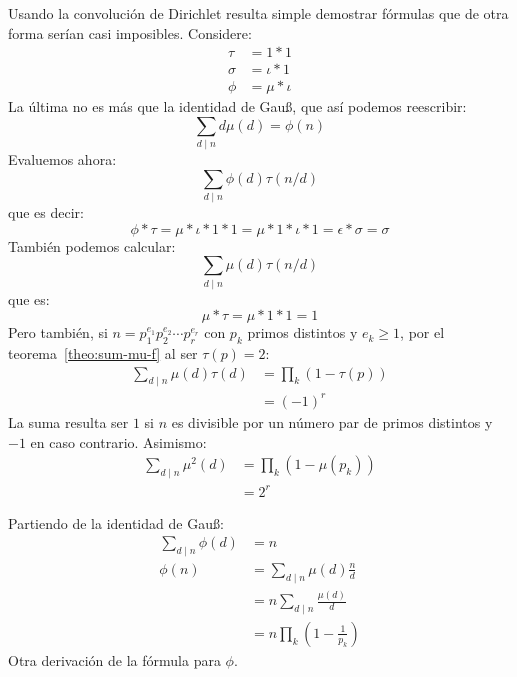   Usando la convolución de Dirichlet%
  resulta simple demostrar fórmulas
  que de otra forma serían casi imposibles.
  Considere:
  \begin{align*}
    \tau
      &= 1 * 1 \\
    \sigma
      &= \iota * 1 \\
    \phi
      &= \mu * \iota
  \end{align*}
  La última no es más que la identidad de Gauß,%
  que así podemos reescribir:
  \begin{equation*}
    \sum_{d \mid n} d \mu(d)
      = \phi(n)
  \end{equation*}
  Evaluemos ahora:
  \begin{equation*}
    \sum_{d \mid n} \phi(d) \tau(n / d)
  \end{equation*}
  que es decir:
  \begin{equation*}
    \phi * \tau
      = \mu * \iota * 1 * 1
      = \mu * 1 * \iota * 1
      = \epsilon * \sigma
      = \sigma
  \end{equation*}
  También podemos calcular:
  \begin{equation*}
    \sum_{d \mid n} \mu(d) \tau(n / d)
  \end{equation*}
  que es:
  \begin{equation*}
    \mu * \tau
      = \mu * 1 * 1
      = 1
  \end{equation*}
  Pero también,
  si \(n = p_1^{e_1} p_2^{e_2} \dotsm p_r^{e_r}\)
  con \(p_k\) primos distintos y \(e_k \ge 1\),
  por el teorema~\ref{theo:sum-mu-f}
  al ser \(\tau(p) = 2\):
  \begin{align*}
    \sum_{d \mid n} \mu(d) \tau(d)
      &= \prod_k (1 - \tau(p)) \\
      &= (-1)^r
  \end{align*}
  La suma resulta ser \(1\)
  si \(n\) es divisible por un número par de primos distintos
  y \(-1\) en caso contrario.
  Asimismo:
  \begin{align*}
    \sum_{d \mid n} \mu^2(d)
      &= \prod_k (1 - \mu(p_k)) \\
      &= 2^r
  \end{align*}

  Partiendo de la identidad de Gauß:%
  \begin{align*}
    \sum_{d \mid n} \phi(d)
      &= n \\
    \phi(n)
      &= \sum_{d \mid n} \mu(d) \frac{n}{d} \\
      &= n \sum_{d \mid n} \frac{\mu(d)}{d} \\
      &= n \prod_k \left( 1 - \frac{1}{p_k} \right)
  \end{align*}
  Otra derivación de la fórmula para \(\phi\).%

